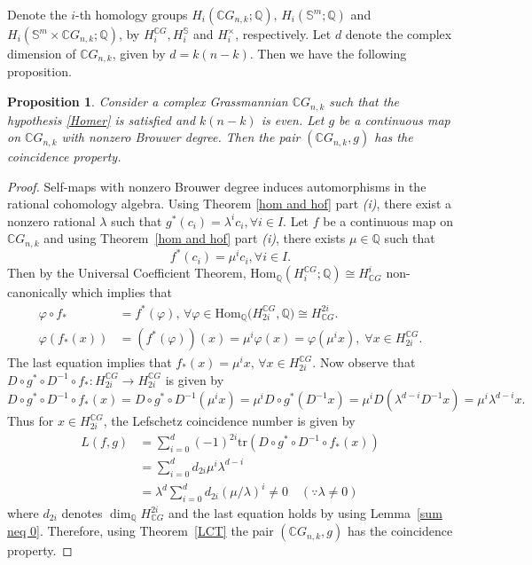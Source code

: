 \documentclass{amsart}
\newtheorem{proposition}[theorem]{Proposition}
\newcommand{\thmref}[1]{Theorem~\ref{#1}}
\newcommand{\lemref}[1]{Lemma~\ref{#1}}
\renewcommand{\hom}{\mathrm{Hom}}
\begin{document}
	
	
	Denote the $i$-th homology groups 
	$H_i(\mathbb{C}G_{n,k}; \mathbb{Q}), \, H_i(\mathbb{S}^m; \mathbb{Q})$ and 
	$H_i(\mathbb{S}^m \times \mathbb{C}G_{n,k}; \mathbb{Q})$, by $H_i^{\mathbb{C}G}, H_i^{\mathbb{S}}$ and $H_i^{\times}$, respectively. Let $d$ denote the complex dimension of $\mathbb CG_{n,k}$, given by $d = k(n - k)$. Then we have the following proposition.
	\begin{proposition}\label{CP of CGnk}
		Consider a complex Grassmannian $\mathbb{C}G_{n,k}$ such that the hypothesis \eqref{Homer} is satisfied and $k(n-k)$ is even. Let $g $ be a continuous map on $\mathbb{C}G_{n,k}$ with nonzero Brouwer degree. Then the pair $(\mathbb{C}G_{n,k}, g)$ has the coincidence property.
	\end{proposition}
	
	
	\begin{proof}
	Self-maps with nonzero Brouwer degree induces automorphisms in the rational cohomology algebra. Using Theorem \ref{hom and hof} part \textit{(i)}, there exist a nonzero rational $\lambda$ such that $g^*(c_i)=\lambda^ic_i, \forall i\in I.$ Let $f$ be a continuous map on $\mathbb CG_{n,k}$ and using \thmref{hom and hof} part \textit{(i)}, there exists $\mu \in \mathbb Q$ such that
		\[
		f^*(c_i)=\mu^ic_i, \forall i\in I.
		\]
		Then by the Universal Coefficient Theorem, $ \hom_{\mathbb{Q}} (H_i^{\mathbb CG};\mathbb Q) \cong H^i_{\mathbb CG}$ non-canonically which implies that 
		\begin{align*}
			\varphi \circ f_* &= f^*(\varphi) , \, \forall
			\varphi \in \hom _{\mathbb Q}\big(H_{2i}^{\mathbb CG}, \mathbb Q\big)\cong H^{2i}_{\mathbb CG}.\\
			\varphi(f_*(x))&=(f^*(\varphi))(x)= \mu^i\varphi(x)=\varphi(\mu^ix),\; \forall x\in H_{2i}^{\mathbb CG}.
		\end{align*}
		The last equation implies that $f_*(x)=\mu^ix,\, \forall x\in  H_{2i}^{\mathbb CG}.$
		Now observe that $D\circ g^*\circ D^{-1}\circ f_*: H_{2i}^{\mathbb CG}\to H_{2i}^{\mathbb CG}$ is given by 
		\[
		D\circ g^*\circ D^{-1}\circ f_*(x)=D\circ g^*\circ D^{-1}(\mu^ix)=\mu^iD\circ g^*(D^{-1}x)=\mu^iD(\lambda^{d-i}D^{-1}x)=\mu^i\lambda^{d-i}x.
		\]
		Thus for $x\in H_{2i}^{\mathbb{C}G}$, the Lefschetz coincidence number is given by
		\[
		\begin{array}{ll}
			L(f,g) &= \sum_{i=0}^d (-1)^{2i}
			\mathrm{tr}(D\circ g^*\circ D^{-1}\circ f_*(x)) \\[6pt]
			&=  \sum_{i=0}^d d_{2i}\mu^i\lambda^{d-i}  \\[6pt]
			&= \lambda^d \sum_{i=0}^d d_{2i}(\mu/\lambda)^i \neq 0 \quad (\because \lambda\neq 0) 
		\end{array}
		\]
		where $d_{2i}$ denotes $\dim_{\mathbb Q}H^{2i}_{\mathbb CG}$ and the last equation holds by using \lemref{sum neq 0}. Therefore, using \thmref{LCT} the pair $(\mathbb{C}G_{n,k},g)$ has the coincidence property.
	\end{proof}
	
\end{document}
